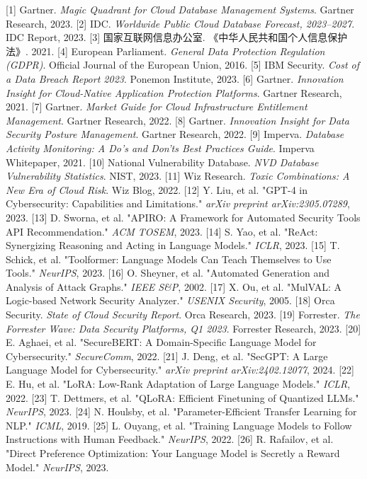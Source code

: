 \documentclass[a4paper,12pt]{ctexart}
\begin{document}
[1] Gartner. \textit{Magic Quadrant for Cloud Database Management Systems}. Gartner Research, 2023.
[2] IDC. \textit{Worldwide Public Cloud Database Forecast, 2023–2027}. IDC Report, 2023.
[3] 国家互联网信息办公室. 《中华人民共和国个人信息保护法》. 2021.
[4] European Parliament. \textit{General Data Protection Regulation (GDPR)}. Official Journal of the European Union, 2016.
[5] IBM Security. \textit{Cost of a Data Breach Report 2023}. Ponemon Institute, 2023.
[6] Gartner. \textit{Innovation Insight for Cloud-Native Application Protection Platforms}. Gartner Research, 2021.
[7] Gartner. \textit{Market Guide for Cloud Infrastructure Entitlement Management}. Gartner Research, 2022.
[8] Gartner. \textit{Innovation Insight for Data Security Posture Management}. Gartner Research, 2022.
[9] Imperva. \textit{Database Activity Monitoring: A Do's and Don'ts Best Practices Guide}. Imperva Whitepaper, 2021.
[10] National Vulnerability Database. \textit{NVD Database Vulnerability Statistics}. NIST, 2023.
[11] Wiz Research. \textit{Toxic Combinations: A New Era of Cloud Risk}. Wiz Blog, 2022.
[12] Y. Liu, et al. "GPT-4 in Cybersecurity: Capabilities and Limitations." \textit{arXiv preprint arXiv:2305.07289}, 2023.
[13] D. Sworna, et al. "APIRO: A Framework for Automated Security Tools API Recommendation." \textit{ACM TOSEM}, 2023.
[14] S. Yao, et al. "ReAct: Synergizing Reasoning and Acting in Language Models." \textit{ICLR}, 2023.
[15] T. Schick, et al. "Toolformer: Language Models Can Teach Themselves to Use Tools." \textit{NeurIPS}, 2023.
[16] O. Sheyner, et al. "Automated Generation and Analysis of Attack Graphs." \textit{IEEE S\&P}, 2002.
[17] X. Ou, et al. "MulVAL: A Logic-based Network Security Analyzer." \textit{USENIX Security}, 2005.
[18] Orca Security. \textit{State of Cloud Security Report}. Orca Research, 2023.
[19] Forrester. \textit{The Forrester Wave: Data Security Platforms, Q1 2023}. Forrester Research, 2023.
[20] E. Aghaei, et al. "SecureBERT: A Domain-Specific Language Model for Cybersecurity." \textit{SecureComm}, 2022.
[21] J. Deng, et al. "SecGPT: A Large Language Model for Cybersecurity." \textit{arXiv preprint arXiv:2402.12077}, 2024.
[22] E. Hu, et al. "LoRA: Low-Rank Adaptation of Large Language Models." \textit{ICLR}, 2022.
[23] T. Dettmers, et al. "QLoRA: Efficient Finetuning of Quantized LLMs." \textit{NeurIPS}, 2023.
[24] N. Houlsby, et al. "Parameter-Efficient Transfer Learning for NLP." \textit{ICML}, 2019.
[25] L. Ouyang, et al. "Training Language Models to Follow Instructions with Human Feedback." \textit{NeurIPS}, 2022.
[26] R. Rafailov, et al. "Direct Preference Optimization: Your Language Model is Secretly a Reward Model." \textit{NeurIPS}, 2023.
\end{document}
